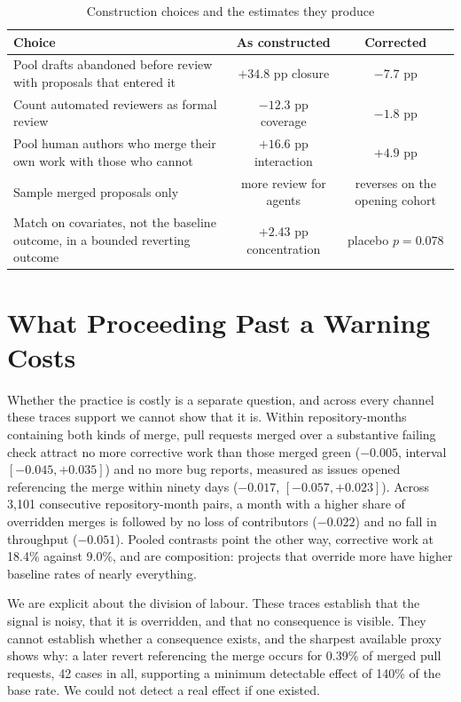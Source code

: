 \documentclass[mnsc]{informs4}
\begin{document}
\begin{table}[t]
\caption{Construction choices and the estimates they produce}
\label{tab:choices}
\centering\small
\begin{tabular}{p{}cc}
\toprule
Choice & As constructed & Corrected \\
\midrule
Pool drafts abandoned before review with proposals that entered it & $+34.8$ pp closure & $-7.7$ pp \\
Count automated reviewers as formal review & $-12.3$ pp coverage & $-1.8$ pp \\
Pool human authors who merge their own work with those who cannot & $+16.6$ pp interaction & $+4.9$ pp \\
Sample merged proposals only & more review for agents & reverses on the opening cohort \\
Match on covariates, not the baseline outcome, in a bounded reverting outcome & $+2.43$ pp concentration & placebo $p=0.078$ \\
\bottomrule
\end{tabular}
\end{table}

\section{What Proceeding Past a Warning Costs}
\label{ec:consequences}


Whether the practice is costly is a separate question, and across every channel
these traces support we cannot show that it is. Within repository-months containing
both kinds of merge, pull requests merged over a substantive failing check attract
no more corrective work than those merged green ($-0.005$, interval
$[-0.045, +0.035]$) and no more bug reports, measured as issues opened referencing
the merge within ninety days ($-0.017$, $[-0.057, +0.023]$). Across 3,101
consecutive repository-month pairs, a month with a higher share of overridden
merges is followed by no loss of contributors ($-0.022$) and no fall in throughput
($-0.051$). Pooled contrasts point the other way, corrective work at 18.4\%
against 9.0\%, and are composition: projects that override more have higher
baseline rates of nearly everything.

We are explicit about the division of labour. These traces establish that the
signal is noisy, that it is overridden, and that no consequence is visible. They
cannot establish whether a consequence exists, and the sharpest available proxy
shows why: a later revert referencing the merge occurs for 0.39\% of merged pull
requests, 42 cases in all, supporting a minimum detectable effect of 140\% of the
base rate. We could not detect a real effect if one existed.
\end{document}
